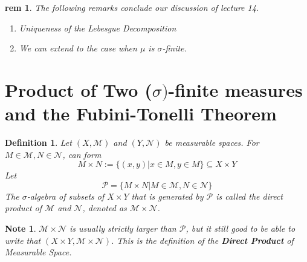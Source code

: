 \documentclass[letterpaper, 12pt]{article}
\newcommand{\fin}{\qquad \quad \hfill \framebox[1.75mm][l]{\,}}
\newcommand{\cM}{\mathcal{M}}
\newcommand{\cN}{\mathcal{N}}
\newcommand{\cP}{\mathcal{P}}
\theoremstyle{stdthm}
\theoremstyle{stddef}
\newtheorem{defn}[thm]{Definition}
\newtheorem{rem}[thm]{rem} %
\theoremstyle{stdnonum}
\newtheorem{note}{Note} %
\theoremstyle{stdqands}
\theoremstyle{stdbold}
\begin{document}
\begin{rem}
The following remarks conclude our discussion of lecture 14.
\begin{enumerate}
\item Uniqueness of the Lebesgue Decomposition
\item We can extend to the case when $\mu$ is $\sigma$-finite. 
\end{enumerate}
\end{rem}

\newpage

\section{Product of Two ($\sigma)$-finite measures and the Fubini-Tonelli Theorem}
\begin{defn}
Let $(X,\cM)$ and $(Y,\cN)$ be measurable spaces. For $M \in \cM, N \in \cN$, can form 
\[ M \times N := \{(x,y)| x \in M, y \in M\} \subseteq X \times Y  \]
Let 
\[\cP = \{ M \times N| M \in \cM, N \in \cN\} \]
The $\sigma$-algebra of subsets of $X\times Y$ that is generated by $\cP$ is called the direct product of $\cM$ and $\cN$, denoted as $\cM \times \cN$. 
\end{defn}

\begin{note}
$\cM \times \cN$ is usually strictly larger than $\cP$, but it still good to be able to write that $(X\times Y, \cM \times \cN)$. This is the definition of the {\bf Direct Product} of Measurable Space. 
\end{note}
\end{document}
